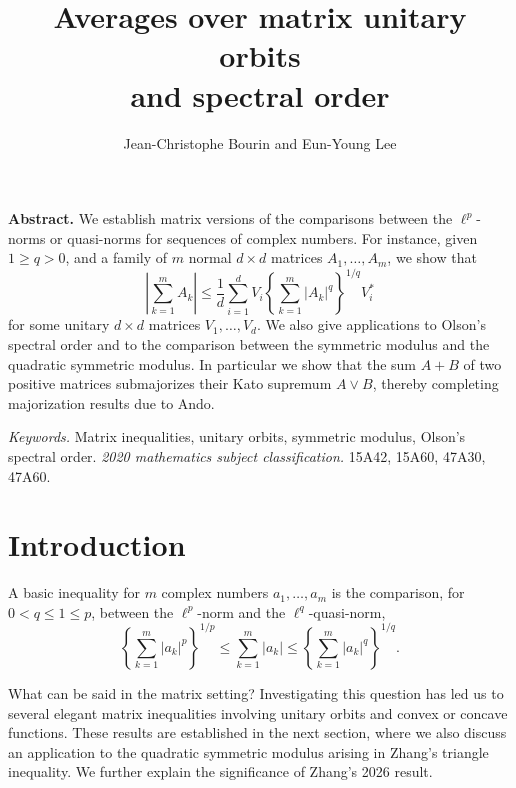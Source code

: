 \documentclass[12pt,reqno]{article}
\theoremstyle{definition}
\theoremstyle{remark}
\numberwithin{equation}{section}
\begin{document}
\baselineskip=15pt

\title{Averages over matrix unitary orbits \\ and  spectral order}

\author{ Jean-Christophe Bourin and Eun-Young Lee}


\date{ }

\maketitle

\vskip 10pt\noindent
{\small
{\bf Abstract.} We establish  matrix versions of the comparisons between the $\ell^p$-norms or quasi-norms for sequences of complex numbers.
For instance, given $1\ge q>0$, and a family of $m$ normal $d\times d$ matrices $A_1,\ldots, A_m$, we show that
$$
\left|\sum_{k=1}^m A_k\right| \le \frac{1}{d}\sum_{i=1}^d V_i\left\{\sum_{k=1}^m  |A_k|^{q}\right\}^{1/q}\!\!\!\!V_i^*
$$
for some unitary $d\times d$ matrices $V_1,\ldots, V_d$.  We also give  applications  to Olson's spectral order  and to the comparison between  the symmetric modulus and the  quadratic symmetric modulus. In particular we show that the sum $A+B$ of two positive matrices submajorizes their Kato supremum $A\vee B$, thereby completing majorization results due to Ando.


\vskip 5pt\noindent
{\it Keywords.} Matrix inequalities,    unitary orbits,  symmetric modulus, Olson's spectral order.
\vskip 5pt\noindent
{\it 2020 mathematics subject classification.}  15A42, 15A60,  47A30, 47A60.
}




\section{Introduction}

A basic inequality for $m$ complex numbers $a_1,\ldots,  a_m$ is the comparison, for $0<q\le 1\le  p$, between the $\ell^p$-norm and the $\ell^q$-quasi-norm,
\begin{equation}\label{elem}
 \left\{\sum_{k=1}^m |a_k|^p\right\}^{1/p} \le  \sum_{k=1}^m |a_k| \le \left\{\sum_{k=1}^m |a_k|^q\right\}^{1/q} .
\end{equation}


What can be said in the matrix setting? Investigating this question has led us to several elegant matrix inequalities involving unitary orbits and convex or concave functions. These results are established in the next section, where we also discuss an application to the quadratic symmetric modulus arising in Zhang’s triangle inequality. We further explain the significance of Zhang’s 2026 result.
\end{document}
